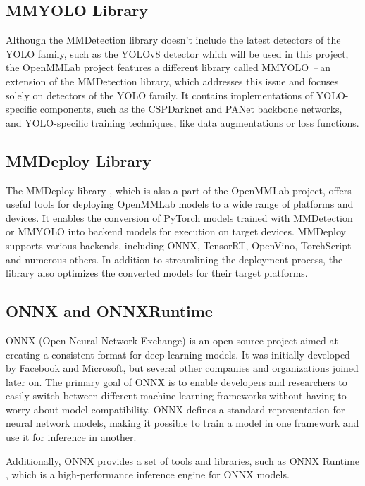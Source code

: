 \subsection{MMYOLO Library}

Although the MMDetection library doesn't include the latest detectors of the
YOLO family, such as the YOLOv8 detector which will be used in this project, the
OpenMMLab project features a different library called MMYOLO
\cite{MMYOLO}\,--\,an extension of the MMDetection library, which addresses this
issue and focuses solely on detectors of the YOLO family. It contains
implementations of YOLO-specific components, such as the CSPDarknet and PANet
backbone networks, and YOLO-specific training techniques, like data
augmentations or loss functions.


\subsection{MMDeploy Library}

The MMDeploy library \cite{MMDeploy}, which is also a part of the OpenMMLab project,
offers useful tools for deploying OpenMMLab models to a wide range of platforms
and devices. It enables the conversion of PyTorch models trained with
MMDetection or MMYOLO into backend models for execution on target devices.
MMDeploy supports various backends, including ONNX, TensorRT, OpenVino,
TorchScript and numerous others. In addition to streamlining the deployment
process, the library also optimizes the converted models for their target
platforms.


\subsection{ONNX and ONNXRuntime}

ONNX (Open Neural Network Exchange) \cite{ONNX} is an open-source project aimed
at creating a consistent format for deep learning models. It was initially
developed by Facebook and Microsoft, but several other companies and
organizations joined later on. The primary goal of ONNX is to enable developers
and researchers to easily switch between different machine learning frameworks
without having to worry about model compatibility. ONNX defines a standard
representation for neural network models, making it possible to train a model in
one framework and use it for inference in another.

Additionally, ONNX provides a set of tools and libraries, such as ONNX Runtime
\cite{ONNXRuntime}, which is a high-performance inference engine for ONNX
models.


